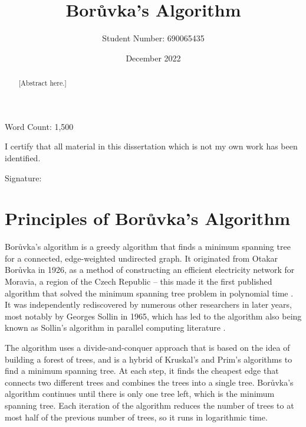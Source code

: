 \documentclass[a4paper, 11pt]{article}
\begin{document}
\title{Borůvka's Algorithm}
\author{Student Number: 690065435}
\date{December 2022}

\maketitle

\begin{abstract}
[Abstract here.]
\end{abstract}



\vspace*{\fill}
\begin{center}
Word Count: 1,500

\vspace{1em}
I certify that all material in this dissertation which is not my own work has been identified.
\end{center}
\vspace{1em}

Signature: \hrulefill

\newpage
\section{Principles of Borůvka's Algorithm}
Borůvka's algorithm is a greedy algorithm that finds a minimum spanning tree for a connected, edge-weighted undirected graph. It originated from Otakar Borůvka in 1926, as a method of constructing an efficient electricity network for Moravia, a region of the Czech Republic \cite{nevsetvril2001otakar} -- this made it the first published algorithm that solved the minimum spanning tree problem in polynomial time \cite{deterministicMSTs}. It was independently rediscovered by numerous other researchers in later years, most notably by Georges Sollin in 1965, which has led to the algorithm also being known as Sollin's algorithm in parallel computing literature \cite{sollin1965trace}. 

The algorithm uses a divide-and-conquer approach that is based on the idea of building a forest of trees, and is a hybrid of Kruskal's and Prim's algorithms to find a minimum spanning tree. At each step, it finds the cheapest edge that connects two different trees and combines the trees into a single tree. Borůvka's algorithm continues until there is only one tree left, which is the minimum spanning tree. Each iteration of the algorithm reduces the number of trees to at most half of the previous number of trees, so it runs in logarithmic time.
\end{document}
